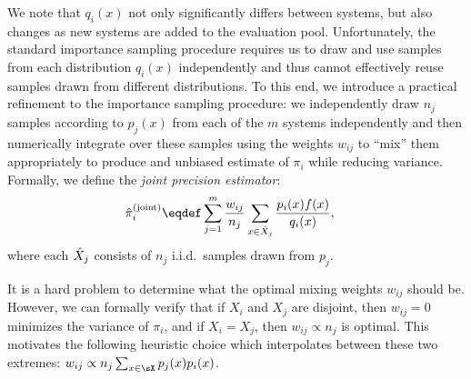 We note that $q_i(x)$ not only significantly differs between systems, but also changes as new systems are added to the evaluation pool.
Unfortunately, the standard importance sampling procedure requires us to draw and use samples from each distribution $q_i(x)$ independently and thus cannot effectively reuse samples drawn from different distributions.
To this end, we introduce a practical refinement to the importance sampling procedure:
we independently draw $n_j$ samples according to $p_j(x)$ from each of the $m$ systems independently 
and then numerically integrate over these samples using the weights $w_{ij}$ to ``mix'' them appropriately to produce and unbiased estimate of $\pi_i$ while reducing variance.
Formally, we define the \emph{joint precision estimator}:
\begin{align*}
  \pih_i^{\text{(joint)}} &\eqdef \sum_{j=1}^m \frac{w_{ij}}{n_{j}} \sum_{x \in \Xh_j} \frac{p_i(x) f(x)}{q_i(x)},
\end{align*}
where each ${\hat{X}}_j$ consists of $n_j$ i.i.d.~samples drawn from $p_j$.

It is a hard problem to determine what the optimal mixing weights $w_{ij}$ should be.
However, we can formally verify that 
  if $X_i$ and $X_j$ are disjoint, then $w_{ij} = 0$ minimizes the variance of $\pi_i$,
  and if $X_i = X_j$, then $w_{ij} \propto n_{j}$ is optimal.
This motivates the following heuristic choice which interpolates between these two extremes:
$w_{ij} \propto n_{j} \sum_{x \in \sX} p_j(x) p_i(x)$.

